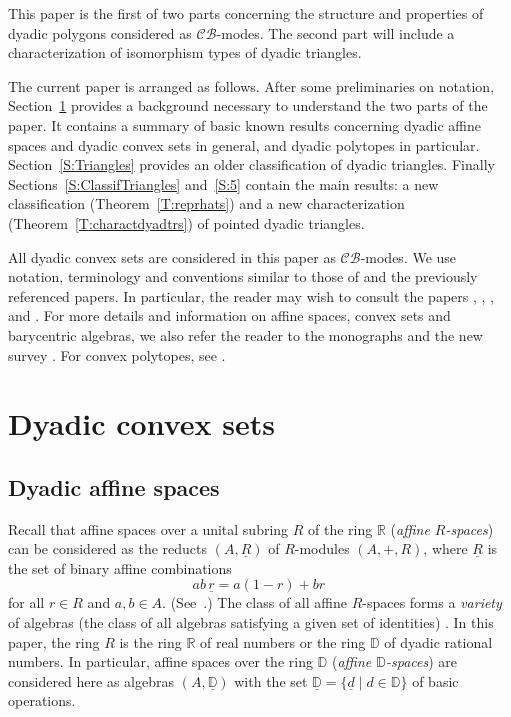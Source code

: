 \documentclass[12pt]{amsart}
\def\mbR{\mathbb{R}}
\def\mbD{\mathbb{D}}
\newcommand{\mc}{\mathcal}
\theoremstyle{plain}
\theoremstyle{definition}
\numberwithin{equation}{section}
\begin{document}
This paper is the first of two parts
concerning the structure and properties of dyadic polygons considered as $\mc{CB}$-modes. The second part will include a characterization of isomorphism types of dyadic triangles.

The current paper is arranged as follows.
After some preliminaries on notation, Section~\ref{S:2}  provides a background necessary to understand the two parts of the paper.
It contains a summary of basic known results concerning dyadic affine spaces and dyadic convex sets in general, and dyadic polytopes in particular. Section~\ref{S:Triangles} provides an older classification of dyadic triangles.
Finally Sections~\ref{S:ClassifTriangles} and~\ref{S:5} contain the main results:  a new classification (Theorem~\ref{T:reprhats}) and a new characterization (Theorem~\ref{T:charactdyadtrs})   of pointed dyadic triangles.


All dyadic convex sets are considered in this paper as $\mathcal{CB}$-modes.
We use notation, terminology and conventions similar to
those of \cite{RS02} and the previously referenced papers. In particular, the reader may
wish to consult the papers \cite{CR13}, \cite{MMR19}, \cite{MMR19a}, \cite{MMR23} and
\cite{MRS11}. For more details and information on affine spaces, convex sets and barycentric
algebras, we also refer the reader to the monographs \cite{RS85, RS02} and the new survey
\cite{R18}. For convex polytopes, see \cite{AB83, BG03, Z95}.




\section{Dyadic convex sets}\label{S:2}

\subsection{Dyadic affine spaces}\label{S:2.1}

Recall that affine spaces over a unital subring $R$ of the ring $\mbR$ (\emph{affine $R$-spaces}) can be considered as the reducts $(A,\underline{R})$ of $R$-modules $(A,+,R)$,
where $\underline{R}$ is the set of binary affine combinations
\begin{equation}\label{E:afoper}
ab\,\underline{r} = a(1-r)+br \,
\end{equation}
for all $r \in R$ and $a,b \in A$. (See~\cite[\S5.3, \S6.3]{RS02}.) The class of all affine $R$-spaces forms a \emph{variety} of algebras (the class of all algebras satisfying a given set of identities) \cite{C75}. In this paper, the ring $R$ is the ring $\mbR$ of real numbers or the ring $\mbD$ of dyadic rational numbers. In particular,
affine spaces over the ring $\mbD$ (\emph{affine $\mbD$-spaces}) are considered here as algebras $(A,\underline{\mbD})$ with the set $\underline{\mbD} = \{\underline{d} \mid d \in \mbD\}$ of basic operations.
\end{document}
